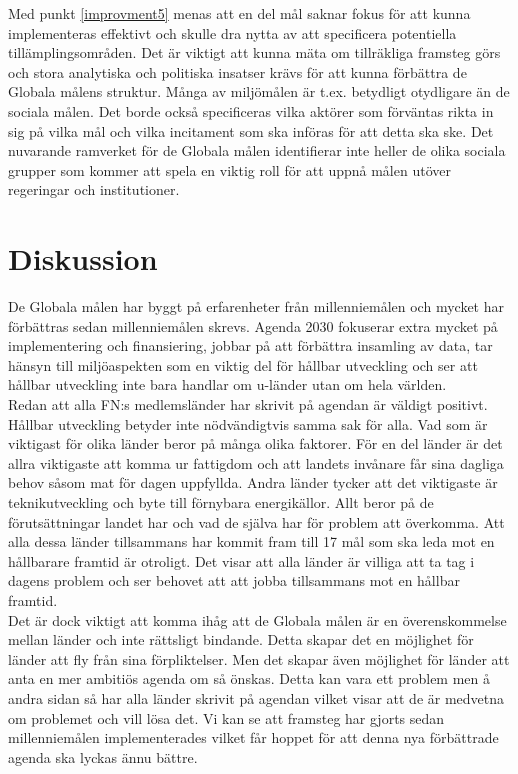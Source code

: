 \documentclass{report}
\begin{document}
Med punkt \ref{improvment5} menas att en del mål saknar fokus för att kunna implementeras effektivt och skulle dra nytta av att specificera potentiella tillämplingsområden. Det är viktigt att kunna mäta om tillräkliga framsteg görs och stora analytiska och politiska insatser krävs för att kunna förbättra de Globala målens struktur. Många av miljömålen  är t.ex. betydligt otydligare än de sociala målen. Det borde också specificeras vilka aktörer som förväntas rikta in sig på vilka mål och vilka incitament som ska införas för att detta ska ske. Det nuvarande ramverket för de Globala målen identifierar inte heller de olika sociala grupper som kommer att spela en viktig roll för att uppnå målen utöver regeringar och institutioner. \cite{review}\\



\newpage
\section{Diskussion}
De Globala målen har byggt på erfarenheter från millenniemålen och mycket har förbättras sedan millenniemålen skrevs. Agenda 2030 fokuserar extra mycket på implementering och finansiering, jobbar på att förbättra insamling av data, tar hänsyn till miljöaspekten som en viktig del för hållbar utveckling och ser att hållbar utveckling inte bara handlar om u-länder utan om hela världen. \\

Redan att alla FN:s medlemsländer har skrivit på agendan är väldigt positivt. Hållbar utveckling betyder inte nödvändigtvis samma sak för alla. Vad som är viktigast för olika länder beror på många olika faktorer. För en del länder är det allra viktigaste att komma ur fattigdom och att landets invånare får sina dagliga behov såsom mat för dagen uppfyllda. Andra länder tycker att det viktigaste är teknikutveckling och byte till förnybara energikällor. Allt beror på de förutsättningar landet har och vad de själva har för problem att överkomma. Att alla dessa länder tillsammans har kommit fram till 17 mål som ska leda mot en hållbarare framtid är otroligt. Det visar att alla länder är villiga att ta tag i dagens problem och ser behovet att att jobba tillsammans mot en hållbar framtid. \\

Det är dock viktigt att komma ihåg att de Globala målen är en överenskommelse mellan länder och inte rättsligt bindande. Detta skapar det en möjlighet för länder att fly från sina förpliktelser. Men det skapar även möjlighet för länder att anta en mer ambitiös agenda om så önskas. Detta kan vara ett problem men å andra sidan så har alla länder skrivit på agendan vilket visar att de är medvetna om problemet och vill lösa det.  Vi kan se att framsteg har gjorts sedan millenniemålen implementerades vilket får hoppet för att denna nya förbättrade agenda ska lyckas ännu bättre. \\
\end{document}
